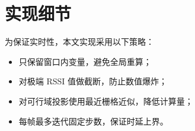 \section{实现细节}
为保证实时性，本文实现采用以下策略：
\begin{itemize}
  \item 只保留窗口内变量，避免全局重算；
  \item 对极端 RSSI 值做截断，防止数值爆炸；
  \item 对可行域投影使用最近栅格近似，降低计算量；
  \item 每帧最多迭代固定步数，保证时延上界。
\end{itemize}
